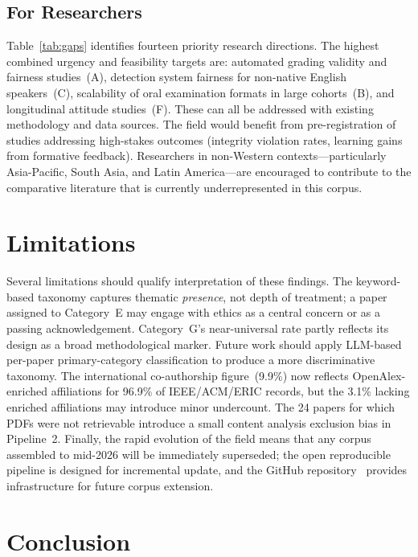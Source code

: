 \documentclass[conference]{IEEEtran}
\begin{document}
\subsection{For Researchers}

Table~\ref{tab:gaps} identifies fourteen priority research directions. The highest combined urgency
and feasibility targets are: automated grading validity and fairness studies~(A), detection system
fairness for non-native English speakers~(C), scalability of oral examination formats in large
cohorts~(B), and longitudinal attitude studies~(F). These can all be addressed with existing
methodology and data sources. The field would benefit from pre-registration of studies addressing
high-stakes outcomes (integrity violation rates, learning gains from formative feedback). Researchers
in non-Western contexts---particularly Asia-Pacific, South Asia, and Latin America---are encouraged
to contribute to the comparative literature that is currently underrepresented in this corpus.

\section{Limitations}
\label{sec:limitations}

Several limitations should qualify interpretation of these findings. The keyword-based taxonomy
captures thematic \textit{presence}, not depth of treatment; a paper assigned to Category~E may
engage with ethics as a central concern or as a passing acknowledgement. Category~G's near-universal
rate partly reflects its design as a broad methodological marker. Future work should apply LLM-based
per-paper primary-category classification to produce a more discriminative taxonomy. The
international co-authorship figure~(9.9\%) now reflects OpenAlex-enriched affiliations for 96.9\%
of IEEE/ACM/ERIC records, but the 3.1\% lacking enriched affiliations may introduce minor undercount.
The 24 papers for which PDFs were not retrievable introduce a small content analysis exclusion bias
in Pipeline~2. Finally, the rapid evolution of the field means that any corpus assembled to mid-2026
will be immediately superseded; the open reproducible pipeline is designed for incremental update,
and the GitHub repository~\cite{sok_repo} provides infrastructure for future corpus extension.

\section{Conclusion}
\label{sec:conclusion}
\end{document}
